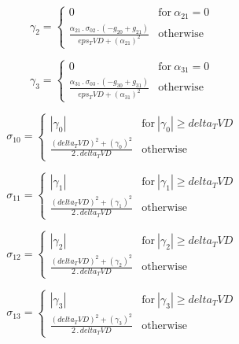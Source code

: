 \documentclass{article}
\begin{document}
\begin{dmath}\gamma_{2} = \begin{cases} 0 & \text{for}\: \alpha_{21} = 0 \\\frac{\alpha_{21} \,.\, \sigma_{0 2} \,.\, \left(- g_{20} + g_{21}\right)}{eps_TVD + \left(\alpha_{21} \right)^{2}} & \text{otherwise} \end{cases}\end{dmath}

\begin{dmath}\gamma_{3} = \begin{cases} 0 & \text{for}\: \alpha_{31} = 0 \\\frac{\alpha_{31} \,.\, \sigma_{0 3} \,.\, \left(- g_{30} + g_{31}\right)}{eps_TVD + \left(\alpha_{31} \right)^{2}} & \text{otherwise} \end{cases}\end{dmath}

\begin{dmath}\sigma_{1 0} = \begin{cases} \left|{\gamma_{0}}\right| & \text{for}\: \left|{\gamma_{0}}\right| \geq delta_TVD \\\frac{\left(delta_TVD \right)^{2} + \left(\gamma_{0} \right)^{2}}{2 \,.\, delta_TVD} & \text{otherwise} 
\end{cases}\end{dmath}

\begin{dmath}\sigma_{1 1} = \begin{cases} \left|{\gamma_{1}}\right| & \text{for}\: \left|{\gamma_{1}}\right| \geq delta_TVD \\\frac{\left(delta_TVD \right)^{2} + \left(\gamma_{1} \right)^{2}}{2 \,.\, delta_TVD} & \text{otherwise} 
\end{cases}\end{dmath}

\begin{dmath}\sigma_{1 2} = \begin{cases} \left|{\gamma_{2}}\right| & \text{for}\: \left|{\gamma_{2}}\right| \geq delta_TVD \\\frac{\left(delta_TVD \right)^{2} + \left(\gamma_{2} \right)^{2}}{2 \,.\, delta_TVD} & \text{otherwise} 
\end{cases}\end{dmath}

\begin{dmath}\sigma_{1 3} = \begin{cases} \left|{\gamma_{3}}\right| & \text{for}\: \left|{\gamma_{3}}\right| \geq delta_TVD \\\frac{\left(delta_TVD \right)^{2} + \left(\gamma_{3} \right)^{2}}{2 \,.\, delta_TVD} & \text{otherwise} 
\end{cases}\end{dmath}
\end{document}
